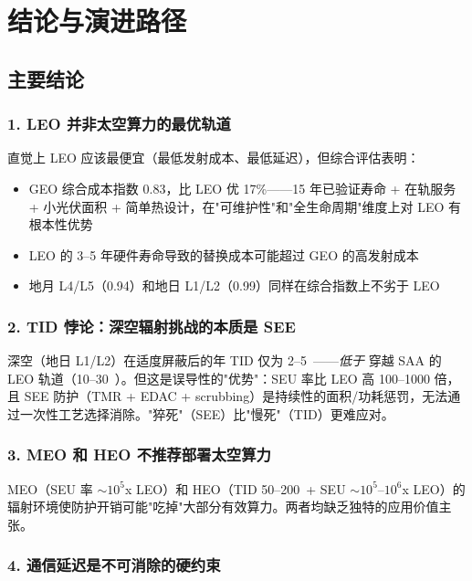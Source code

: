
\section{结论与演进路径}

\subsection{主要结论}

\subsubsection{1. LEO 并非太空算力的最优轨道}

直觉上 LEO 应该最便宜（最低发射成本、最低延迟），但综合评估表明：
\begin{itemize}
    \item GEO 综合成本指数 0.83，比 LEO 优 17\%——15 年已验证寿命 + 在轨服务 + 小光伏面积 + 简单热设计，在"可维护性"和"全生命周期"维度上对 LEO 有根本性优势
    \item LEO 的 3--5 年硬件寿命导致的替换成本可能超过 GEO 的高发射成本
    \item 地月 L4/L5（0.94）和地日 L1/L2（0.99）同样在综合指数上不劣于 LEO
\end{itemize}

\subsubsection{2. TID 悖论：深空辐射挑战的本质是 SEE}

深空（地日 L1/L2）在适度屏蔽后的年 TID 仅为 2--5~\kradyr——\textit{低于} 穿越 SAA 的 LEO 轨道（10--30~\kradyr）。但这是误导性的"优势"：SEU 率比 LEO 高 100--1000 倍，且 SEE 防护（TMR + EDAC + scrubbing）是持续性的面积/功耗惩罚，无法通过一次性工艺选择消除。"猝死"（SEE）比"慢死"（TID）更难应对。

\subsubsection{3. MEO 和 HEO 不推荐部署太空算力}

MEO（SEU 率 $\sim 10^{5}$x LEO）和 HEO（TID 50--200~\kradyr + SEU $\sim 10^{5}$--$10^{6}$x LEO）的辐射环境使防护开销可能"吃掉"大部分有效算力。两者均缺乏独特的应用价值主张。

\subsubsection{4. 通信延迟是不可消除的硬约束}

